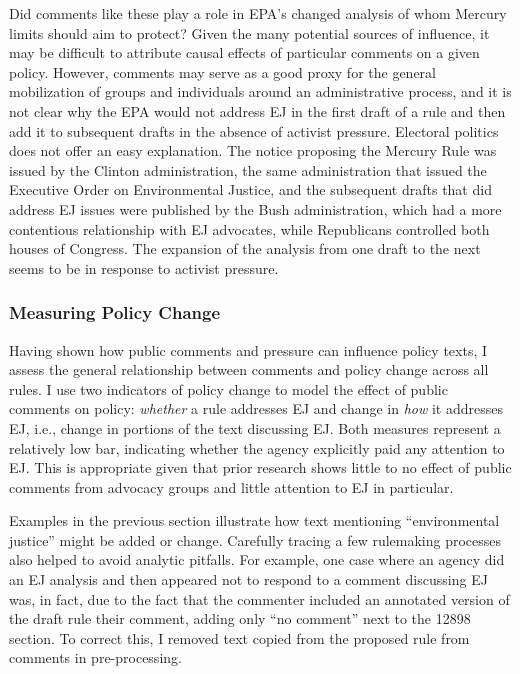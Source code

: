 \documentclass[
      12pt,
        ]{article}
\begin{document}
Did comments like these play a role in EPA's changed analysis of
whom Mercury limits should aim to protect?
Given the many potential sources of influence, it may be difficult to
attribute causal effects of particular comments on a given policy.
However, comments may serve as a good proxy for the general mobilization
of groups and individuals around an administrative process, and it is
not clear why the EPA would not address EJ in the first
draft of a rule and then add it to subsequent drafts in the absence of
activist pressure. Electoral politics does not offer an easy
explanation. The notice proposing the Mercury Rule was issued by the
Clinton administration, the same administration that issued the
Executive Order on Environmental Justice, and the subsequent drafts that
did address EJ issues were published by the Bush
administration, which had a more contentious relationship with
EJ advocates, while Republicans controlled both
houses of Congress. The expansion of the analysis from one draft to the
next seems to be in response to activist pressure.

\hypertarget{measuring-policy-change}{%
\subsubsection{Measuring Policy Change}\label{measuring-policy-change}}

Having shown how public comments and pressure can influence policy texts, I assess the general relationship between comments and policy change across all rules. I use two indicators of policy change to model the effect of public comments on policy: \emph{whether} a rule addresses EJ and change in \emph{how} it addresses EJ, i.e., change in portions of the text discussing EJ. Both measures represent a relatively low bar, indicating whether the agency explicitly paid any attention to EJ. This is appropriate given that prior research shows little to no effect of public comments from advocacy groups and little attention to EJ in particular.

Examples in the previous section illustrate how text mentioning ``environmental justice'' might be added or change. Carefully tracing a few rulemaking processes also helped to avoid analytic pitfalls. For example, one case where an agency did an EJ analysis and then appeared not to respond to a comment discussing EJ was, in fact, due to the fact that the commenter included an annotated version of the draft rule their comment, adding only ``no comment'' next to the 12898 section. To correct this, I removed text copied from the proposed rule from comments in pre-processing.
\end{document}
